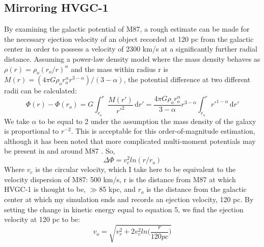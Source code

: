 \documentclass{aastex62}
\begin{document}
\subsection{Mirroring HVGC-1}
By examining the galactic potential of M87, a rough estimate can be made for the necessary ejection velocity of an object recorded at 120 pc from the galactic center in order to possess a velocity of 2300 km/s at a significantly further radial distance. Assuming a power-law density model where the mass density behaves as $\rho(r) = \rho_{o}(r_{o}/r)^\alpha$ and the mass within radius r is $M(r) = (4\pi G\rho_{o}r_{o}^\alpha r^{3-\alpha})/(3-\alpha)$, the potential difference at two different radii can be calculated:
\begin{equation}
\Phi(r) - \Phi(r_{o}) = G\int_{r_{o}}^{r} \! \frac{M(r')}{r'^2} \, \mathrm{d}r' = \frac{4\pi G\rho_{o}r_{o}^\alpha }{3-\alpha} r^{3-\alpha}\int_{r_{o}}^{r} \! r'^{1-\alpha} \, \mathrm{d}r'
\end{equation}
We take $\alpha$ to be equal to 2 under the assumption the mass density of the galaxy is proportional to $r^{-2}$. This is acceptable for this order-of-magnitude estimation, although it has been noted that more complicated multi-moment potentials may be present in and around M87 \citep{mur14}. So,
\begin{equation}
 \Delta\Phi= v_{c}^{2}ln(r/r_{o})
\end{equation}
Where $v_{c}$ is the circular velocity, which I take here to be equivalent to the velocity dispersion of M87: 500 km/s, r is the distance from M87 at which HVGC-1 is thought to be, $\gg$85 kpc, and $r_{o}$ is the distance from the galactic center at which my simulation ends and records an ejection velocity, 120 pc. By setting the change in kinetic energy equal to equation 5, we find the ejection velocity at 120 pc to be:
\begin{equation}
v_{o} = \sqrt{v_{r}^2 + 2v_{c}^{2}ln\bigg(\frac{r}{120 pc}\bigg)}
\end{equation}
\end{document}
